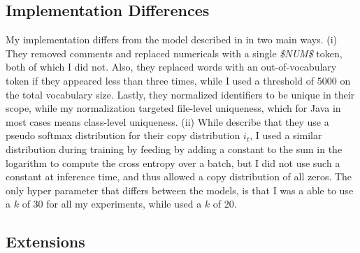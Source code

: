 \documentclass[11pt]{article}
\begin{document}
\subsection{Implementation Differences}
My implementation differs from the model described in \cite{bhoopchand2016learning} in two main ways. (i) They removed comments and replaced numericals with a single 	\textit{\$NUM\$} token, both of which I did not. Also, they replaced words with an out-of-vocabulary token if they appeared less than three times, while I used a threshold of 5000 on the total vocabulary size. Lastly, they normalized identifiers to be unique in their scope, while my normalization targeted file-level uniqueness, which for Java in most cases means class-level uniqueness. (ii) While \cite{bhoopchand2016learning} describe that they use a pseudo softmax distribution for their copy distribution $i_t$, I used a similar distribution during training by feeding by adding a constant to the sum in the logarithm to compute the cross entropy over a batch, but I did not use such a constant at inference time, and thus allowed a copy distribution of all zeros.
The only hyper parameter that differs between the models, is that I was a able to use a $k$ of 30 for all my experiments, while \cite{bhoopchand2016learning} used a $k$ of 20.
\subsection{Extensions}
\label{extensions}
\end{document}
